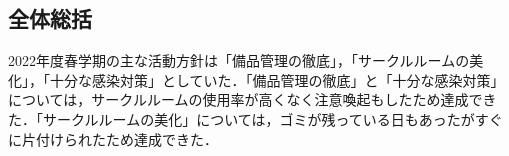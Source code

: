 \subsection*{全体総括}


2022年度春学期の主な活動方針は「備品管理の徹底」，「サークルルームの美化」，「十分な感染対策」としていた．「備品管理の徹底」と「十分な感染対策」については，サークルルームの使用率が高くなく注意喚起もしたため達成できた．「サークルルームの美化」については，ゴミが残っている日もあったがすぐに片付けられたため達成できた．